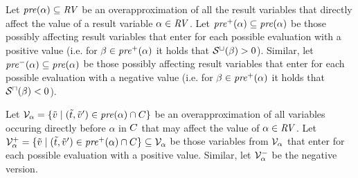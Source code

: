 \begin{definition}
  Let $\mathit{pre}(\alpha) \subseteq \mathit{RV}$ be an overapproximation of all the result variables that directly affect the value of a result variable $\alpha \in \mathit{RV}$.
  Let $\mathit{pre}^+(\alpha) \subseteq \mathit{pre}(\alpha)$ be those possibly affecting result variables that enter for each possible evaluation with a positive value
  (i.e. for $\beta \in \mathit{pre}^+(\alpha)$ it holds that ${\mathcal{S}^\sqcup}(\beta) > 0$).
  Similar, let $\mathit{pre}^-(\alpha) \subseteq \mathit{pre}(\alpha)$ be those possibly affecting result variables that enter for each possible evaluation with a negative value
  (i.e. for $\beta \in \mathit{pre}^+(\alpha)$ it holds that ${\mathcal{S}^\sqcap}(\beta) < 0$).
\end{definition}

\begin{definition}
  Let $\mathcal{V}_\alpha = \lbrace  \tilde{v} \mid (\tilde{t}, \tilde{v}') \in \mathit{pre}(\alpha) \cap C  \rbrace$ be an overapproximation of all variables occuring directly before $\alpha$ in $C$ that may affect the value of $\alpha \in \mathit{RV}$.
  Let $\mathcal{V}^+_\alpha = \lbrace  \tilde{v} \mid (\tilde{t}, \tilde{v}') \in \mathit{pre}^+(\alpha) \cap C  \rbrace \subseteq \mathcal{V}_\alpha$ be those variables from $\mathcal{V}_\alpha$ that enter for each possible evaluation with a positive value.
  Similar, let $\mathcal{V}^-_\alpha$ be the negative version.
\end{definition}

